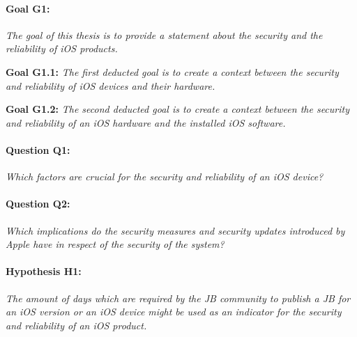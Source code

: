 \paragraph{Goal G1:} \textit{\glqq The goal of this thesis is to provide a statement about the security and the reliability of iOS products.\grqq{}} \par
\textbf{Goal G1.1: }\textit{\glqq The first deducted goal is to create a context between the security and reliability of iOS devices and their hardware.\grqq{}} \par
\textbf{Goal G1.2:} \textit{\glqq The second deducted goal is to create a context between the security and reliability of an iOS hardware and the installed iOS software.\grqq{}}\par
\paragraph{Question Q1:} \textit{\glqq Which factors are crucial for the security and reliability of an iOS device?\grqq{}} \par
\paragraph{Question Q2:} \textit{\glqq Which implications do the security measures and security updates introduced by Apple have in respect of the security of the system?\grqq{}} \par

\paragraph{Hypothesis H1:} \textit{\glqq The amount of days which are required by the JB community to publish a JB for an iOS version or an iOS device might be used as an indicator for the security and reliability of an iOS product.\grqq{}} \par

